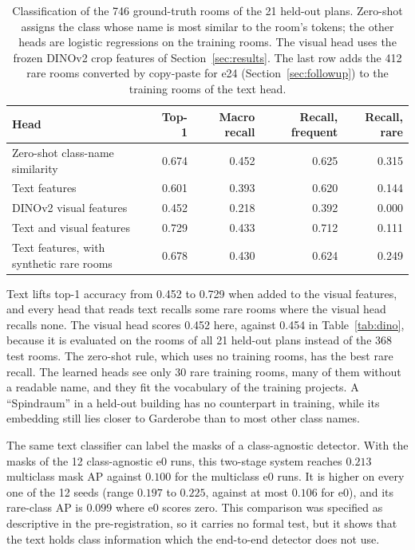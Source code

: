 \begin{table}[H]
\centering
\caption{Classification of the 746 ground-truth rooms of the 21 held-out plans.
Zero-shot assigns the class whose name is most similar to the room's tokens;
the other heads are logistic regressions on the training rooms. The visual
head uses the frozen DINOv2 crop features of Section~\ref{sec:results}. The
last row adds the 412 rare rooms converted by copy-paste for e24
(Section~\ref{sec:followup}) to the training rooms of the text head.}
\label{tab:ocrstage1}
\small
\begin{tabular}{@{}lrrrr@{}}
\toprule
Head & Top-1 & Macro recall & Recall, frequent & Recall, rare \\
\midrule
Zero-shot class-name similarity & 0.674 & 0.452 & 0.625 & 0.315 \\
Text features & 0.601 & 0.393 & 0.620 & 0.144 \\
DINOv2 visual features & 0.452 & 0.218 & 0.392 & 0.000 \\
Text and visual features & 0.729 & 0.433 & 0.712 & 0.111 \\
\midrule
Text features, with synthetic rare rooms & 0.678 & 0.430 & 0.624 & 0.249 \\
\bottomrule
\end{tabular}
\end{table}

Text lifts top-1 accuracy from 0.452 to 0.729 when added to the visual
features, and every head that reads text recalls some rare rooms where the
visual head recalls none. The visual head scores 0.452 here, against 0.454 in
Table~\ref{tab:dino}, because it is evaluated on the rooms of all 21 held-out
plans instead of the 368 test rooms. The zero-shot rule, which uses no training rooms,
has the best rare recall. The learned heads see only 30 rare training rooms,
many of them without a readable name, and they fit the vocabulary of the
training projects. A ``Spindraum'' in a held-out building has no counterpart in
training, while its embedding still lies closer to Garderobe than to most other
class names.

The same text classifier can label the masks of a class-agnostic detector. With
the masks of the 12 class-agnostic e0 runs, this two-stage system reaches
$0.213$ multiclass mask AP against $0.100$ for the multiclass e0 runs. It is
higher on every one of the 12 seeds (range $0.197$ to $0.225$, against at most
$0.106$ for e0), and its rare-class AP is $0.099$ where e0 scores zero. This
comparison was specified as descriptive in the pre-registration, so it carries
no formal test, but it shows that the text holds class information which the
end-to-end detector does not use.

